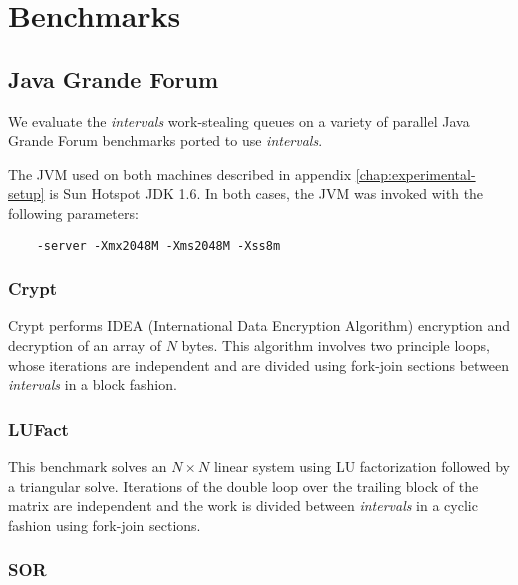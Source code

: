 
\chapter{Benchmarks}
\label{chap:appendix-benchmarks}

\section{Java Grande Forum}
\label{sec:benchmarks-jgf}

We evaluate the \emph{intervals} work-stealing queues on a variety of
parallel Java Grande Forum benchmarks \cite{Smith2001}
\cite{Mathew1999} \cite{Gregg2003} ported to use \emph{intervals}.

The JVM used on both machines described in appendix
\ref{chap:experimental-setup} is Sun Hotspot JDK 1.6. In both cases,
the JVM was invoked with the following parameters:

\begin{verbatim}
    -server -Xmx2048M -Xms2048M -Xss8m
\end{verbatim}

\subsection*{Crypt}

Crypt performs IDEA (International Data Encryption Algorithm)
encryption and decryption of an array of $N$ bytes. This algorithm
involves two principle loops, whose iterations are independent and are
divided using fork-join sections between \emph{intervals} in a block fashion.

\subsection*{LUFact}

This benchmark solves an $N \times N$ linear system using LU factorization
followed by a triangular solve. Iterations of the double loop over the
trailing block of the matrix are independent and the work is divided
between \emph{intervals} in a cyclic fashion using fork-join sections.

\subsection*{SOR}

